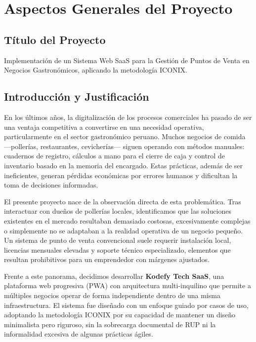 \documentclass[12pt, a4paper]{article}
\begin{document}
\newpage
\tableofcontents
\newpage
\listoffigures
\newpage
\listoftables
\newpage

\section{Aspectos Generales del Proyecto}

\subsection{Título del Proyecto}

Implementación de un Sistema Web SaaS para la Gestión de Puntos de Venta en Negocios Gastronómicos, aplicando la metodología ICONIX.

\subsection{Introducción y Justificación}

En los últimos años, la digitalización de los procesos comerciales ha pasado de ser una ventaja competitiva a convertirse en una necesidad operativa, particularmente en el sector gastronómico peruano. Muchos negocios de comida ---pollerías, restaurantes, cevicherías--- siguen operando con métodos manuales: cuadernos de registro, cálculos a mano para el cierre de caja y control de inventario basado en la memoria del encargado. Estas prácticas, además de ser ineficientes, generan pérdidas económicas por errores humanos y dificultan la toma de decisiones informadas.

El presente proyecto nace de la observación directa de esta problemática. Tras interactuar con dueños de pollerías locales, identificamos que las soluciones existentes en el mercado resultaban demasiado costosas, excesivamente complejas o simplemente no se adaptaban a la realidad operativa de un negocio pequeño. Un sistema de punto de venta convencional suele requerir instalación local, licencias mensuales elevadas y soporte técnico especializado, elementos que resultan prohibitivos para un emprendedor con márgenes ajustados.

Frente a este panorama, decidimos desarrollar \textbf{Kodefy Tech SaaS}, una plataforma web progresiva (PWA) con arquitectura multi-inquilino que permite a múltiples negocios operar de forma independiente dentro de una misma infraestructura. El sistema fue diseñado con un enfoque guiado por casos de uso, adoptando la metodología ICONIX por su capacidad de mantener un diseño minimalista pero riguroso, sin la sobrecarga documental de RUP ni la informalidad excesiva de algunas prácticas ágiles.
\end{document}

